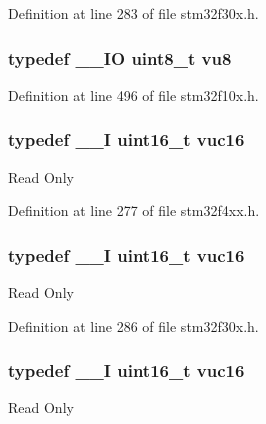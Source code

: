 Definition at line 283 of file stm32f30x.\-h.

\hypertarget{group___exported__types_ga4a8fa9a2b4796540a6d65a04eb18e111}{
\subsubsection[{vu8}]{\setlength{\rightskip}{0pt plus 5cm}typedef \-\_\-\-\_\-\-I\-O {\bf uint8\-\_\-t} {\bf vu8}}}\label{group___exported__types_ga4a8fa9a2b4796540a6d65a04eb18e111}


Definition at line 496 of file stm32f10x.\-h.

\hypertarget{group___exported__types_ga7f6037565f0caa27727c8b871daf0d56}{
\subsubsection[{vuc16}]{\setlength{\rightskip}{0pt plus 5cm}typedef \-\_\-\-\_\-\-I {\bf uint16\-\_\-t} {\bf vuc16}}}\label{group___exported__types_ga7f6037565f0caa27727c8b871daf0d56}
Read Only 

Definition at line 277 of file stm32f4xx.\-h.

\hypertarget{group___exported__types_ga7f6037565f0caa27727c8b871daf0d56}{
\subsubsection[{vuc16}]{\setlength{\rightskip}{0pt plus 5cm}typedef \-\_\-\-\_\-\-I {\bf uint16\-\_\-t} {\bf vuc16}}}\label{group___exported__types_ga7f6037565f0caa27727c8b871daf0d56}
Read Only 

Definition at line 286 of file stm32f30x.\-h.

\hypertarget{group___exported__types_ga7f6037565f0caa27727c8b871daf0d56}{
\subsubsection[{vuc16}]{\setlength{\rightskip}{0pt plus 5cm}typedef \-\_\-\-\_\-\-I {\bf uint16\-\_\-t} {\bf vuc16}}}\label{group___exported__types_ga7f6037565f0caa27727c8b871daf0d56}
Read Only 

